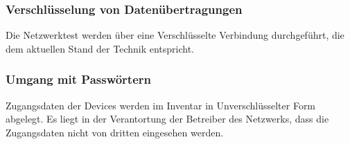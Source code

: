 \documentclass[
	ngerman,
	toc=listof, %
	toc=bibliography, %
	footnotes=multiple, %
	parskip=half, %
	numbers=noendperiod %
]{scrartcl}
\begin{document}
		\subsubsection{Verschlüsselung von Datenübertragungen}
		Die Netzwerktest werden über eine Verschlüsselte Verbindung durchgeführt, die dem aktuellen Stand der Technik entspricht.

		\subsubsection{Umgang mit Passwörtern}
		Zugangsdaten der Devices werden im Inventar in Unverschlüsselter Form abgelegt. Es liegt in der Verantortung der Betreiber des Netzwerks, dass die Zugangsdaten nicht von dritten eingesehen werden.
\end{document}
